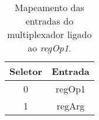\begin{table}[]
\centering
\begin{tabular}{|c|c|}
\hline
\textbf{Seletor} & \textbf{Entrada} \\ \hline
0       & regOp1  \\ \hline
1       & regArg  \\ \hline
\end{tabular}
\caption{Mapeamento das entradas do multiplexador ligado ao \textit{regOp1}.}
\label{table_muxRegOp1}
\end{table}	